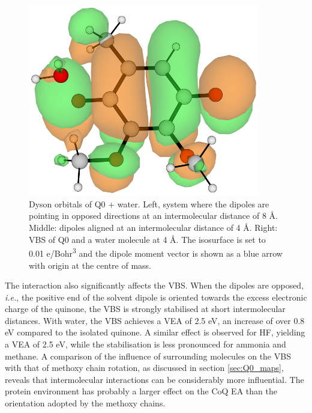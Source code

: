 \begin{figure}[h]
\begin{minipage}[b]{0.3\textwidth}
  \end{minipage}
  \hfill
  \begin{minipage}[b]{0.3\textwidth}
    \centering
    \includegraphics[width=0.9\textwidth]{chapters/results/image/Q0_H2O_VBS.png}
  \end{minipage}
  \caption[Dyson orbitals of Q0+water]{Dyson orbitals of Q0 + water. Left, system where the dipoles are pointing in opposed directions at an intermolecular distance of 8 \r{A}. Middle: dipoles aligned at an intermolecular distance of 4 \r{A}. Right: VBS of Q0 and a water molecule at 4 \r{A}. The isosurface is set to 0.01 e/Bohr\textsuperscript{3} and the dipole moment vector is shown as a blue arrow with origin at the centre of mass.}
  \label{fig:Q0_H2O_dyson}
\end{figure}

The interaction also significantly affects the VBS. When the dipoles are opposed, \textit{i.e.}, the positive end of the solvent dipole is oriented towards the excess electronic charge of the quinone, the VBS is strongly stabilised at short intermolecular distances. With water, the VBS achieves a VEA of 2.5 eV, an increase of over 0.8 eV compared to the isolated quinone. A similar effect is observed for HF, yielding a VEA of 2.5 eV, while the stabilisation is less pronounced for ammonia and methane. A comparison of the influence of surrounding molecules on the VBS with that of methoxy chain rotation, as discussed in section \ref{sec:Q0_maps}, reveals that intermolecular interactions can be considerably more influential. The protein environment has probably a larger effect on the CoQ EA than the orientation adopted by the methoxy chains.

